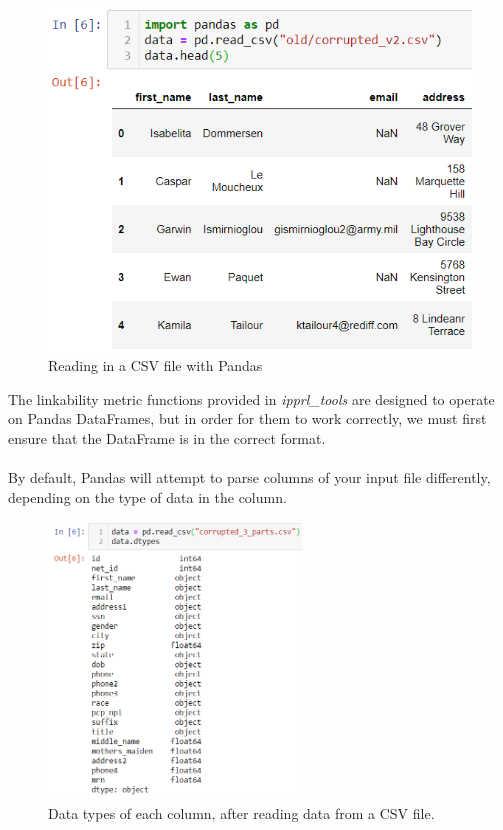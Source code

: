 \documentclass[titlepage, 11pt]{article}
\newcommand{\pkgname}{\textit{ipprl\_tools}}
\begin{document}
\begin{figure}[H]
    \centering
    \includegraphics{imgs/PandasRead.png}
    \caption{Reading in a CSV file with Pandas}
    \label{fig:my_label}
\end{figure}

The linkability metric functions provided in \pkgname{} are designed to operate on Pandas DataFrames, but in order for them to work correctly, we must first ensure that the DataFrame is in the correct format.
\\
\\
\noindent By default, Pandas will attempt to parse columns of your input file differently, depending on the type of data in the column.
\begin{figure}[H]
    \centering
    \includegraphics[width=0.6\textwidth]{imgs/DataTypes.PNG}
    \caption{Data types of each column, after reading data from a CSV file.}
    \label{fig:my_label}
\end{figure}
\end{document}
